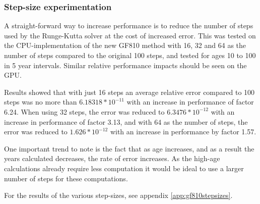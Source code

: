\subsubsection{Step-size experimentation}
A straight-forward way to increase performance is to reduce the number of steps used by the Runge-Kutta solver at the cost of increased error.
This was tested on the CPU-implementation of the new GF810 method with 16, 32 and 64 as the number of steps compared to the original 100 steps, and tested for ages 10 to 100 in 5 year intervals.
Similar relative performance impacts should be seen on the GPU.

Results showed that with just 16 steps an average relative error compared to 100 steps was no more than $6.18318 * 10^{-11}$ with an increase in performance of factor 6.24.
When using 32 steps, the error was reduced to $6.3476 * 10^{-12}$ with an increase in performance of factor 3.13, and with 64 as the number of steps, the error was reduced to $1.626 * 10^{-12}$ with an increase in performance by factor 1.57.

One important trend to note is the fact that as age increases, and as a result the years calculated decreases, the rate of error increases.
As the high-age calculations already require less computation it would be ideal to use a larger number of steps for these computations.

For the results of the various step-sizes, see appendix \ref{app:gf810stepsizes}.

